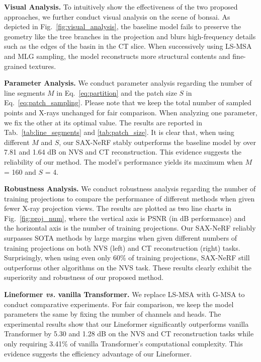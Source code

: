 \documentclass[10pt,twocolumn,letterpaper]{article}
\begin{document}
\vspace{0.5mm}
\noindent\textbf{Visual Analysis.} To intuitively show the effectiveness of the two proposed approaches, we further conduct visual analysis on the scene of bonsai. As depicted in Fig.~\ref{fig:visual_analysis}, the baseline model fails to preserve the geometry like the tree branches in the projection and blurs high-frequency details such as the edges of the basin in the CT slice. When successively using LS-MSA and MLG sampling, the model reconstructs more structural contents and fine-grained textures. 

\vspace{0.5mm}
\noindent\textbf{Parameter Analysis.} We conduct parameter analysis regarding the number of line segments $M$ in Eq.~\eqref{eq:partition} and the patch size $S$ in Eq.~\eqref{eq:patch_sampling}. Please note that we keep the total number of sampled points and X-rays unchanged for fair comparison. When analyzing one parameter, we fix the other at its optimal value. The results are reported in Tab.~\ref{tab:line_segments} and \ref{tab:patch_size}. It is clear that, when using different $M$ and $S$, our SAX-NeRF stably outperforms the baseline model by over 7.81 and 1.64 dB on NVS and CT reconstruction. This evidence suggests the reliability of our method. The model's performance yields its maximum when $M$ = 160 and $S$ = 4.

\vspace{0.5mm}
\noindent\textbf{Robustness Analysis.} We conduct robustness analysis regarding the number of training projections to compare the performance of different methods when given fewer X-ray projection views. The results are plotted as two line charts in Fig.~\ref{fig:proj_num}, where the vertical axis is PSNR (in dB performance) and the horizontal axis is the number of training projections.  Our SAX-NeRF reliably surpasses SOTA methods by large margins when given different numbers of training projections on both NVS (left) and CT reconstruction (right) tasks. Surprisingly, when using even only 60\% of training projections, SAX-NeRF still outperforms other algorithms on the NVS task. These results clearly exhibit the superiority and robustness of our proposed method.

\vspace{0.5mm}
\noindent\textbf{Lineformer \emph{vs.} vanilla Transformer.} We replace  LS-MSA with G-MSA to conduct comparative experiments. For fair comparison, we keep the model parameters the same by fixing the number of channels and heads. The experimental results show that our Lineformer significantly outperforms vanilla Transformer by 5.30 and 1.28 dB on the NVS and CT reconstruction tasks while only requiring 3.41\% of vanilla Transformer's computational complexity. This evidence suggests the efficiency advantage of our Lineformer.
\end{document}
